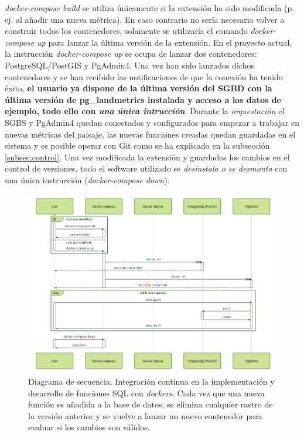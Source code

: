 \textit{docker-compose build} se utiliza únicamente si la extensión ha sido modificada (p. ej. al añadir una nueva métrica). En caso contrario no sería necesario volver a construir todos los contenedores, solamente se utilizaría el comando \textit{docker-compose up} para lanzar la última versión de la extensión. En el proyecto actual, la instrucción \textit{docker-compose up} se ocupa de lanzar dos contenedores: PostgreSQL/PostGIS y PgAdmin4. Una vez han sido lanzados dichos contenedores y se han recibido las notificaciones de que la conexión ha tenido éxito, \textbf{el usuario ya dispone de la última versión del SGBD con la última versión de pg\_landmetrics instalada y acceso a los datos de ejemplo, todo ello con \textit{una única intrucción}}. Durante la \textit{orquestación} el SGBS y PgAdmin4 quedan conectados y configurados para empezar a trabajar en nuevas métricas del paisaje, las nuevas funciones creadas quedan guardadas en el sistema y es posible operar con Git como se ha explicado en la subsección \ref{subsec:control}. Una vez modificada la extensión y guardados los cambios en el control de versiones, todo el software utilizado se \textit{desinstala o se desmonta} con una única instrucción (\textit{docker-compose down}).

\begin{figure}
\begin{center}
\includegraphics[width=\textwidth]{Metodologia/Figs/ci.png}
\caption{Diagrama de secuencia. Integración continua en la implementación y desarrollo de funciones SQL con \textit{dockers}. Cada vez que una nueva función es añadida a la base de datos, se elimina cualquier rastro de la versión anterior y se vuelve a lanzar un nuevo contenedor para evaluar si los cambios son válidos. \label{fig:ci}}
\end{center}
\end{figure}


